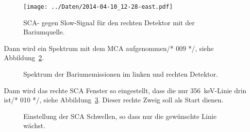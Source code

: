 \begin{figure}[htbp]
    \centering
    \texttt{[image: ../Daten/2014-04-10\_12-28-east.pdf]}
    \caption{%
        SCA- gegen Slow-Signal für den rechten Detektor mit der Bariumquelle.
    }
    \label{fig:eine_pulshoehe_ba}
\end{figure}

Dann wird ein Spektrum mit dem MCA aufgenommen/* 009 */, siehe Abbildung~\ref{mca:ba_spek}.

\begin{figure}[htbp]
    \centering
    \hfill
    \caption{%
        Spektrum der Bariumemissionen im linken und rechten Detektor.
    }
    \label{mca:ba_spek}
\end{figure}

Dann wird das rechte SCA Fenster so eingestellt, dass die nur
\SI{356}{\kilo\electronvolt}-Linie drin ist/* 010 */, siehe
Abbildung~\ref{mca:ba_spek_sca}. Dieser rechte Zweig soll als Start dienen.

\begin{figure}[htbp]
    \centering
    \hfill
    \caption{%
        Einstellung der SCA Schwellen, so dass nur die gewünschte Linie wächst.
    }
    \label{mca:ba_spek_sca}
\end{figure}


